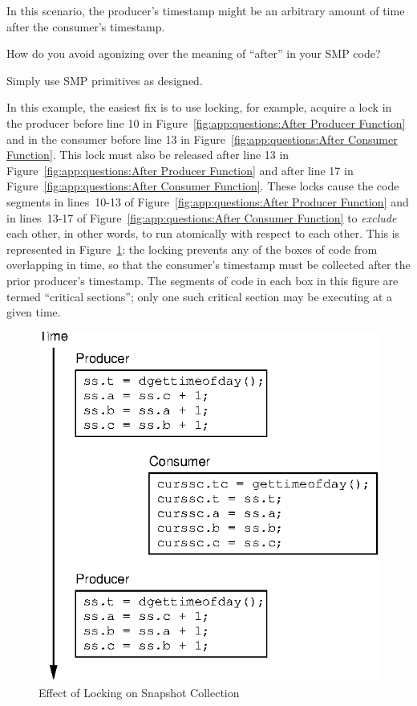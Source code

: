 In this scenario, the producer's timestamp might be an arbitrary
amount of time after the consumer's timestamp.

How do you avoid agonizing over the meaning of ``after'' in your
SMP code?

Simply use SMP primitives as designed.

In this example, the easiest fix is to use locking, for example,
acquire a lock in the producer before line 10 in
Figure~\ref{fig:app:questions:After Producer Function} and in
the consumer before line 13 in
Figure~\ref{fig:app:questions:After Consumer Function}.
This lock must also be released after line 13 in
Figure~\ref{fig:app:questions:After Producer Function} and
after line 17 in
Figure~\ref{fig:app:questions:After Consumer Function}.
These locks cause the code segments in lines~10-13 of
Figure~\ref{fig:app:questions:After Producer Function} and in lines~13-17 of
Figure~\ref{fig:app:questions:After Consumer Function} to {\em exclude}
each other, in other words, to run atomically with respect to each other.
This is represented in
Figure~\ref{fig:app:questions:Effect of Locking on Snapshot Collection}:
the locking prevents any of the boxes of code from overlapping in time, so
that the consumer's timestamp must be collected after the prior
producer's timestamp.
The segments of code in each box in this figure are termed
``critical sections''; only one such critical section may be executing
at a given time.

\begin{figure}[htb]
\centering
\includegraphics{appendix/questions/after}
\caption{Effect of Locking on Snapshot Collection}
\label{fig:app:questions:Effect of Locking on Snapshot Collection}
\end{figure}

